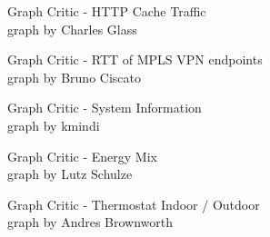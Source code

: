 \begin{frame}{Graph Critic - HTTP Cache Traffic}
\\
graph by Charles Glass
\end{frame}

\begin{frame}{Graph Critic - RTT of MPLS VPN endpoints}
\\
graph by Bruno Ciscato
\end{frame}

\begin{frame}{Graph Critic - System Information}
\\
graph by kmindi
\end{frame}

\begin{frame}{Graph Critic - Energy Mix}
\\
graph by Lutz Schulze
\end{frame}

\begin{frame}{Graph Critic - Thermostat Indoor / Outdoor}
\\
graph by Andres Brownworth
\end{frame}



